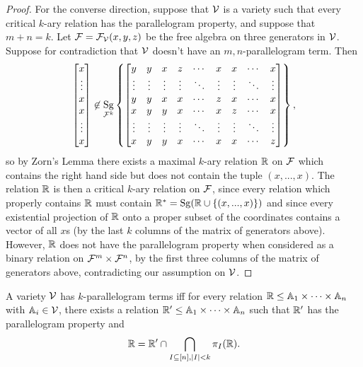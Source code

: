 \documentclass[letterpaper,11pt]{article}
\DeclareMathOperator{\Sg}{Sg}
\begin{document}
\begin{proof}
For the converse direction, suppose that $\mathcal{V}$ is a variety such that every critical $k$-ary relation has the parallelogram property, and suppose that $m+n = k$. Let $\mathcal{F} = \mathcal{F}_{\mathcal{V}}(x,y,z)$ be the free algebra on three generators in $\mathcal{V}$. Suppose for contradiction that $\mathcal{V}$ doesn't have an $m,n$-parallelogram term. Then
\[
\begin{bmatrix} x\\ \vdots\\ x\\ x\\ \vdots\\ x \end{bmatrix} \not\in \Sg_{\cF^k}\left\{\begin{bmatrix} y & y & x & z & \cdots & x & x & \cdots & x\\ \vdots & \vdots & \vdots & \vdots & \ddots & \vdots & \vdots & \ddots & \vdots\\ y & y & x & x & \cdots & z & x & \cdots & x\\ x & y & y & x & \cdots & x & z & \cdots & x\\ \vdots & \vdots & \vdots & \vdots & \ddots & \vdots & \vdots & \ddots & \vdots\\ x & y & y & x & \cdots & x & x & \cdots & z \end{bmatrix}\right\},
\]
so by Zorn's Lemma there exists a maximal $k$-ary relation $\mathbb{R}$ on $\mathcal{F}$ which contains the right hand side but does not contain the tuple $(x,...,x)$. The relation $\mathbb{R}$ is then a critical $k$-ary relation on $\mathcal{F}$, since every relation which properly contains $\mathbb{R}$ must contain $\RR^* = \Sg(\RR \cup \{(x,...,x)\})$ and since every existential projection of $\mathbb{R}$ onto a proper subset of the coordinates contains a vector of all $x$s (by the last $k$ columns of the matrix of generators above). However, $\mathbb{R}$ does not have the parallelogram property when considered as a binary relation on $\mathcal{F}^m\times \mathcal{F}^n$, by the first three columns of the matrix of generators above, contradicting our assumption on $\mathcal{V}$.
\end{proof}

\begin{cor} A variety $\mathcal{V}$ has $k$-parallelogram terms iff for every relation $\mathbb{R} \le \mathbb{A}_1 \times \cdots \times \mathbb{A}_n$ with $\mathbb{A}_i \in \mathcal{V}$, there exists a relation $\mathbb{R}' \le \mathbb{A}_1 \times \cdots \times \mathbb{A}_n$ such that $\mathbb{R}'$ has the parallelogram property and
\[
\mathbb{R} = \mathbb{R}' \cap \bigcap_{I \subseteq [n], |I| < k} \pi_{I}(\mathbb{R}).
\]
\end{cor}
\end{document}
